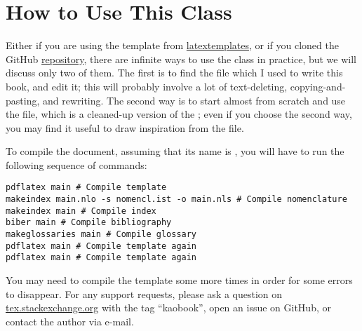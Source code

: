 \section{How to Use This Class}

Either if you are using the template from 
\href{http://latextemplates.org/template/kaobook}{latextemplates}, or if 
you cloned the GitHub 
\href{https://www.github.com/fmarotta/kaobook}{repository}, there are 
infinite ways to use the  class in practice, but we will 
discuss only two of them. The first is to find the  file 
which I used to write this book, and edit it; this will probably involve 
a lot of text-deleting, copying-and-pasting, and rewriting. The second 
way is to start almost from scratch and use the 
 file, which is a cleaned-up 
version of the ; even if you 
choose the second way, you may find it useful to draw inspiration from 
the  file.

To compile the document, assuming that its name is , you 
will have to run the following sequence of commands:

\begin{lstlisting}[style=kaolstplain,linewidth=1.5\textwidth]
pdflatex main # Compile template
makeindex main.nlo -s nomencl.ist -o main.nls # Compile nomenclature
makeindex main # Compile index
biber main # Compile bibliography
makeglossaries main # Compile glossary
pdflatex main # Compile template again
pdflatex main # Compile template again
\end{lstlisting}

You may need to compile the template some more times in order for some 
errors to disappear. For any support requests, please ask a question on 
\url{tex.stackexchange.org} with the tag \enquote{kaobook}, open an 
issue on GitHub, or contact the author via e-mail.
